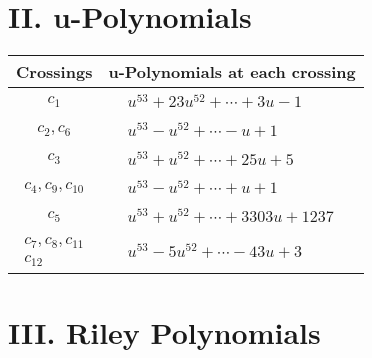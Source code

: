 \documentclass[1p]{elsarticle_modified}
\theoremstyle{definition}
\begin{document}
\newpage\renewcommand{\arraystretch}{1}
\centering \section*{ II. u-Polynomials}
\begin{tabular}{m{50pt}|m{274pt}}
Crossings & \hspace{64pt}u-Polynomials at each crossing \\
\hline $$\begin{aligned}c_{1}\end{aligned}$$&$\begin{aligned}
&u^{53}+23 u^{52}+\cdots+3 u-1
\end{aligned}$\\
\hline $$\begin{aligned}c_{2},c_{6}\end{aligned}$$&$\begin{aligned}
&u^{53}- u^{52}+\cdots- u+1
\end{aligned}$\\
\hline $$\begin{aligned}c_{3}\end{aligned}$$&$\begin{aligned}
&u^{53}+u^{52}+\cdots+25 u+5
\end{aligned}$\\
\hline $$\begin{aligned}c_{4},c_{9},c_{10}\end{aligned}$$&$\begin{aligned}
&u^{53}- u^{52}+\cdots+u+1
\end{aligned}$\\
\hline $$\begin{aligned}c_{5}\end{aligned}$$&$\begin{aligned}
&u^{53}+u^{52}+\cdots+3303 u+1237
\end{aligned}$\\
\hline $$\begin{aligned}c_{7},c_{8},c_{11}\\c_{12}\end{aligned}$$&$\begin{aligned}
&u^{53}-5 u^{52}+\cdots-43 u+3
\end{aligned}$\\
\hline
\end{tabular}\newpage\renewcommand{\arraystretch}{1}
\centering \section*{ III. Riley Polynomials}
\end{document}
